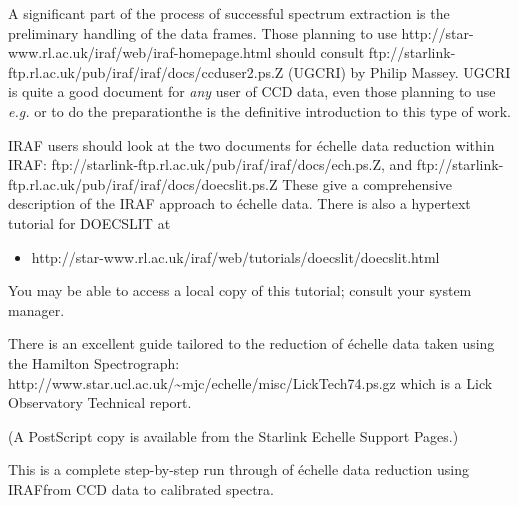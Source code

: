 A significant part of the process of successful spectrum extraction
is the preliminary handling of the  data frames.
Those planning to use
{http://star-www.rl.ac.uk/iraf/web/iraf-homepage.html} should consult
{ftp://starlink-ftp.rl.ac.uk/pub/iraf/iraf/docs/ccduser2.ps.Z} (UGCRI) by Philip Massey.
UGCRI is quite a good document for {\em any} user of CCD data, even those
planning to use {\em e.g.}  or
 to do the preparation\sgspec{---}{ - }the
 is the definitive
introduction to this type of work.

IRAF users should look at the two documents for \'{e}chelle data reduction
within IRAF:
{ftp://starlink-ftp.rl.ac.uk/pub/iraf/iraf/docs/ech.ps.Z}, and
{ftp://starlink-ftp.rl.ac.uk/pub/iraf/iraf/docs/doecslit.ps.Z}
These give a comprehensive description of the IRAF approach to \'{e}chelle
data.  There is also a hypertext tutorial for DOECSLIT at

\begin{itemize}

\item {}
      {http://star-www.rl.ac.uk/iraf/web/tutorials/doecslit/doecslit.html}

\end{itemize}

You may be able to access a local copy of this tutorial; consult your
system manager.

There is an excellent guide tailored to the reduction of \'{e}chelle
data taken using the Hamilton Spectrograph:
{http://www.star.ucl.ac.uk/\~{}mjc/echelle/misc/LickTech74.ps.gz} which is a
Lick Observatory Technical report\@.
\begin{latexonly}
(A PostScript copy is available from the Starlink Echelle Support
Pages.)
\end{latexonly}
This is a complete
step-by-step run through of \'{e}chelle data reduction using
IRAF\sgspec{---}{ - }from CCD data to calibrated spectra.


